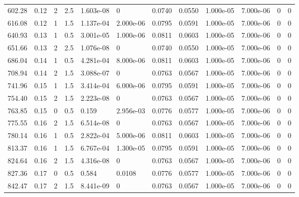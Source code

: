 \documentclass[preview]{standalone}
\begin{document}
{{\begin{tabular}{L{1.2cm}C{1.2cm} C{0.3cm}C{0.5cm} C{1.4cm}C{1.4cm} C{1.4cm}C{1.4cm} C{1.6cm}C{1.6cm} C{1.6cm}C{1.6cm}}
  602.28  &  0.12  & 2     & 2.5 &  1.603e-08  & 0  &  0.0740&   0.0550& 1.000e-05 & 7.000e-06   &  0 & 0  \\ 
  616.08  &  0.12  & 1     & 1.5 &  1.137e-04  & 2.000e-06  &  0.0795&   0.0591& 1.000e-05 & 7.000e-06   &  0 & 0  \\ 
  640.93  &  0.13  & 1     & 0.5 &  3.001e-05  & 1.000e-06  &  0.0811&   0.0603& 1.000e-05 & 7.000e-06   &  0 & 0  \\ 
  651.66  &  0.13  & 2     & 2.5 &  1.076e-08  & 0  &  0.0740&   0.0550& 1.000e-05 & 7.000e-06   &  0 & 0  \\ 
  686.04  &  0.14  & 1     & 0.5 &  4.281e-04  & 8.000e-06  &  0.0811&   0.0603& 1.000e-05 & 7.000e-06   &  0 & 0  \\ 
  708.94  &  0.14  & 2     & 1.5 &  3.088e-07  & 0  &  0.0763&   0.0567& 1.000e-05 & 7.000e-06   &  0 & 0  \\ 
  741.96  &  0.15  & 1     & 1.5 &  3.414e-04  & 6.000e-06  &  0.0795&   0.0591& 1.000e-05 & 7.000e-06   &  0 & 0  \\ 
  754.40  &  0.15  & 2     & 1.5 &  2.223e-08  & 0  &  0.0763&   0.0567& 1.000e-05 & 7.000e-06   &  0 & 0  \\ 
  763.85  &  0.15  & 0     & 0.5 &  0.159  & 2.956e-03  &  0.0776&   0.0577& 1.000e-05 & 7.000e-06   &  0 & 0  \\ 
  775.55  &  0.16  & 2     & 1.5 &  6.514e-08  & 0  &  0.0763&   0.0567& 1.000e-05 & 7.000e-06   &  0 & 0  \\ 
  780.14  &  0.16  & 1     & 0.5 &  2.822e-04  & 5.000e-06  &  0.0811&   0.0603& 1.000e-05 & 7.000e-06   &  0 & 0  \\ 
  813.37  &  0.16  & 1     & 1.5 &  6.767e-04  & 1.300e-05  &  0.0795&   0.0591& 1.000e-05 & 7.000e-06   &  0 & 0  \\ 
  824.64  &  0.16  & 2     & 1.5 &  4.316e-08  & 0  &  0.0763&   0.0567& 1.000e-05 & 7.000e-06   &  0 & 0  \\ 
  827.36  &  0.17  & 0     & 0.5 &  0.584  & 0.0108  &  0.0776&   0.0577& 1.000e-05 & 7.000e-06   &  0 & 0  \\ 
  842.47  &  0.17  & 2     & 1.5 &  8.441e-09  & 0  &  0.0763&   0.0567& 1.000e-05 & 7.000e-06   &  0 & 0  \\ 
\hline 
\end{tabular} 

}}
\end{document}
